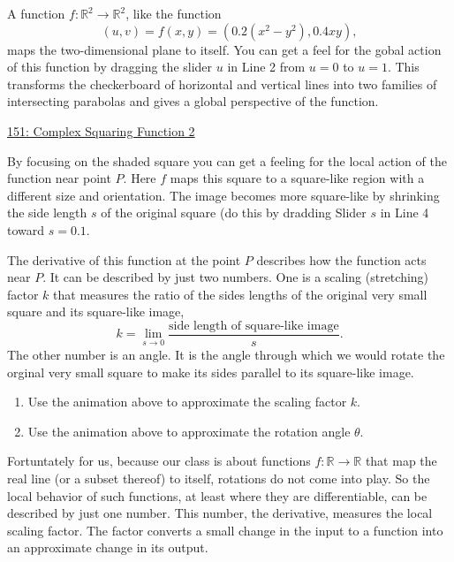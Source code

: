 \documentclass{ximera}
\begin{document}
\begin{example} \label{Exmefr3r430}
A function $f:\mathbb{R}^2\to \mathbb{R}^2$, like the function
\[
  (u,v) = f(x,y) = (0.2(x^2-y^2) , 0.4xy) ,
\]
maps the two-dimensional plane to itself. You can get a feel for the gobal action of this function by dragging the slider $u$ in Line 2 from $u=0$ to $u=1$. This transforms the checkerboard of horizontal and vertical lines into two families of intersecting parabolas and gives a global perspective of the function.

\begin{onlineOnly}
    \begin{center}
\end{center}
\end{onlineOnly}

\href{https://www.desmos.com/calculator/59nrhmvrka}{151: Complex Squaring Function 2}

By focusing on the shaded square you can get a feeling for the local action of the function near point $P$. Here $f$ maps this square to a square-like region with a different size and orientation. The image becomes more square-like by shrinking the side length $s$ of the original square (do this by dradding Slider $s$ in Line 4 toward $s=0.1$.

The derivative of this function at the point $P$ describes how the function acts near $P$. It can be described by just two numbers. One is a scaling (stretching) factor $k$ that measures the ratio of the sides lengths of the original very small square and its square-like image, 
\[
         k = \lim_{s\to 0}\frac{\text{side length of square-like image}}{s} .
\]
The other number is an angle. It is the angle through which we would rotate the orginal very small square to make its sides parallel to its square-like image. 

\begin{question} \label{Q:LDFDFDF}
\begin{enumerate}
\item Use the animation above to approximate the scaling factor $k$.

\item Use the animation above to approximate the rotation angle $\theta$.
\end{enumerate}
\end{question} 

\end{example}

Fortuntately for us, because our class is about functions $f:\mathbb{R}\to \mathbb{R}$ that map the real line (or a subset thereof) to itself, rotations do not come into play. So the local behavior of such functions, at least where they are differentiable, can be described by just one number. This number, the derivative, measures the local scaling factor. The factor converts a small change in the input to a function into an approximate change in its output.
\end{document}
